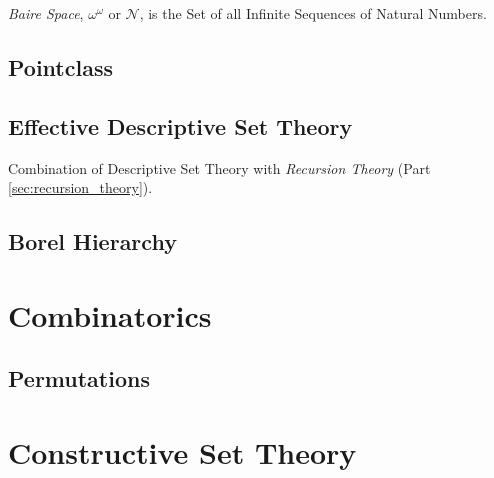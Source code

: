 \documentclass{article}
\begin{document}
\emph{Baire Space}, $\omega^{\omega}$ or $\mathcal{N}$, is the Set of
all Infinite Sequences of Natural Numbers.



\subsection{Pointclass}\label{subsec:pointclass}

\subsection{Effective Descriptive Set Theory}

Combination of Descriptive Set Theory with \emph{Recursion Theory}
(Part \ref{sec:recursion_theory}).

\subsection{Borel Hierarchy}\label{subsec:borel_hierarchy}



\section{Combinatorics}

\subsection{Permutations}\label{subsec:permutations}



\section{Constructive Set Theory}\label{sec:constructive_set_theory}
\end{document}
